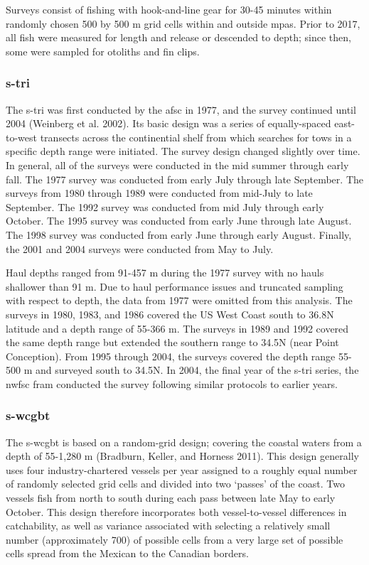 \documentclass[11pt,
  english,
  letterpaper,
]{article}
\begin{document}
Surveys consist of fishing with hook-and-line gear for 30-45 minutes within randomly chosen 500 by 500 m grid cells within and outside \glspl{mpa}. Prior to 2017, all fish were measured for length and release or descended to depth; since then, some were sampled for otoliths and fin clips.

\hypertarget{section-2}{%
\subsubsection{\texorpdfstring{\acrlong{s-tri}}{}}\label{section-2}}

The \gls{s-tri} was first conducted by the \gls{afsc} in 1977, and the survey continued until 2004 (Weinberg et al. 2002). Its basic design was a series of equally-spaced east-to-west transects across the continential shelf from which searches for tows in a specific depth range were initiated. The survey design changed slightly over time. In general, all of the surveys were conducted in the mid summer through early fall. The 1977 survey was conducted from early July through late September. The surveys from 1980 through 1989 were conducted from mid-July to late September. The 1992 survey was conducted from mid July through early October. The 1995 survey was conducted from early June through late August. The 1998 survey was conducted from early June through early August. Finally, the 2001 and 2004 surveys were conducted from May to July.

Haul depths ranged from 91-457 m during the 1977 survey with no hauls shallower than 91 m. Due to haul performance issues and truncated sampling with respect to depth, the data from 1977 were omitted from this analysis. The surveys in 1980, 1983, and 1986 covered the US West Coast south to 36.8\textdegree N latitude and a depth range of 55-366 m. The surveys in 1989 and 1992 covered the same depth range but extended the southern range to 34.5\textdegree N (near Point Conception). From 1995 through 2004, the surveys covered the depth range 55-500 m and surveyed south to 34.5\textdegree N. In 2004, the final year of the \gls{s-tri} series, the \gls{nwfsc} \gls{fram} conducted the survey following similar protocols to earlier years.

\hypertarget{section-3}{%
\subsubsection{\texorpdfstring{\acrlong{s-wcgbt}}{}}\label{section-3}}

The \Gls{s-wcgbt} is based on a random-grid design; covering the coastal waters from a depth of 55-1,280 m (Bradburn, Keller, and Horness 2011). This design generally uses four industry-chartered vessels per year assigned to a roughly equal number of randomly selected grid cells and divided into two `passes' of the coast. Two vessels fish from north to south during each pass between late May to early October. This design therefore incorporates both vessel-to-vessel differences in catchability, as well as variance associated with selecting a relatively small number (approximately 700) of possible cells from a very large set of possible cells spread from the Mexican to the Canadian borders.
\end{document}
